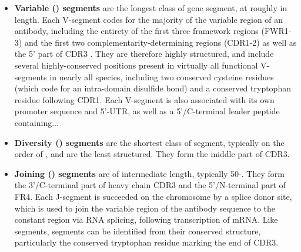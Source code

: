 \begin{itemize}
\item \textbf{Variable (\vh) segments} are the longest class of gene segment, at roughly  in length. Each V-segment codes for the majority of the variable region of an antibody, including the entirety of the first three framework regions (FWR1-3) and the first two complementarity-determining regions (CDR1-2) as well as the 5' part of CDR3 \parencite{jung2006vdjr}. They are therefore highly structured, and include several highly-conserved positions present in virtually all functional V-segments in nearly all species, including two conserved cysteine residues (which code for an intra-domain disulfide bond) and a conserved tryptophan residue following CDR1. Each V-segment is also associated with its own promoter sequence and 5'-UTR, as well as a 5'/C-terminal leader peptide containing... %
\item \textbf{Diversity (\dh) segments} are the shortest class of segment, typically on the order of , and are the least structured. They form the middle part of CDR3.  %
\item \textbf{Joining (\jh) segments} are of intermediate length, typically 50-. They form the 3'/C-terminal part of heavy chain CDR3 and the 5'/N-terminal part of FR4. Each J-segment is succeeded on the chromosome by a splice donor site, which is used to join the variable region of the antibody sequence to the constant region via RNA splicing, following transcription of \igh{} mRNA. Like \vh segments, \jh segments can be identified from their conserved structure, particularly the conserved tryptophan residue marking the end of CDR3.
\end{itemize}


